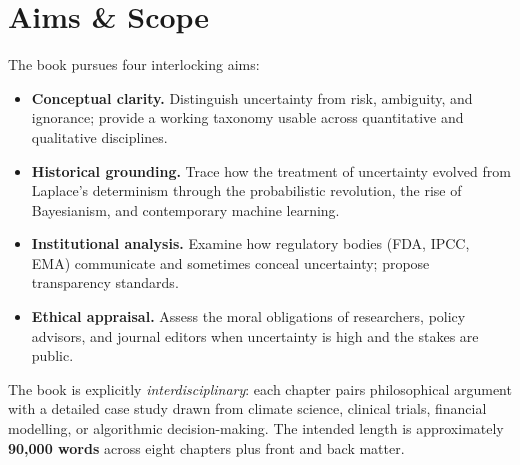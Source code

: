 \section{Aims \& Scope}

The book pursues four interlocking aims:

\begin{itemize}
  \item \textbf{Conceptual clarity.} Distinguish uncertainty from risk, ambiguity, and ignorance; provide a working taxonomy usable across quantitative and qualitative disciplines.
  \item \textbf{Historical grounding.} Trace how the treatment of uncertainty evolved from Laplace's determinism through the probabilistic revolution, the rise of Bayesianism, and contemporary machine learning.
  \item \textbf{Institutional analysis.} Examine how regulatory bodies (FDA, IPCC, EMA) communicate and sometimes conceal uncertainty; propose transparency standards.
  \item \textbf{Ethical appraisal.} Assess the moral obligations of researchers, policy advisors, and journal editors when uncertainty is high and the stakes are public.
\end{itemize}

The book is explicitly \emph{interdisciplinary}: each chapter pairs philosophical argument with a detailed case study drawn from climate science, clinical trials, financial modelling, or algorithmic decision-making. The intended length is approximately \textbf{90,000 words} across eight chapters plus front and back matter.

